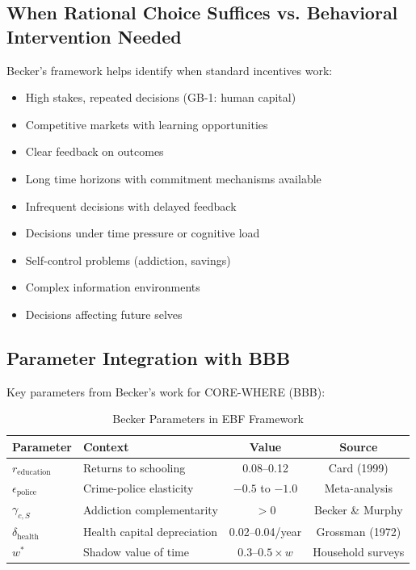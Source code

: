\subsection{When Rational Choice Suffices vs. Behavioral Intervention Needed}

Becker's framework helps identify when standard incentives work:

\begin{tcolorbox}[colback=green!5!white,colframe=green!75!black,title=Rational Choice Sufficient]
\begin{itemize}
    \item High stakes, repeated decisions (GB-1: human capital)
    \item Competitive markets with learning opportunities
    \item Clear feedback on outcomes
    \item Long time horizons with commitment mechanisms available
\end{itemize}
\end{tcolorbox}

\begin{tcolorbox}[colback=red!5!white,colframe=red!75!black,title=Behavioral Intervention Needed]
\begin{itemize}
    \item Infrequent decisions with delayed feedback
    \item Decisions under time pressure or cognitive load
    \item Self-control problems (addiction, savings)
    \item Complex information environments
    \item Decisions affecting future selves
\end{itemize}
\end{tcolorbox}

\subsection{Parameter Integration with BBB}

Key parameters from Becker's work for CORE-WHERE (BBB):

\begin{table}[htbp]
\centering
\caption{Becker Parameters in EBF Framework}
\label{tab:gb-parameters}
\begin{tabular}{llcc}
\toprule
\textbf{Parameter} & \textbf{Context} & \textbf{Value} & \textbf{Source} \\
\midrule
$r_{\text{education}}$ & Returns to schooling & 0.08--0.12 & Card (1999) \\
$\epsilon_{\text{police}}$ & Crime-police elasticity & $-0.5$ to $-1.0$ & Meta-analysis \\
$\gamma_{c,S}$ & Addiction complementarity & $> 0$ & Becker \& Murphy \\
$\delta_{\text{health}}$ & Health capital depreciation & 0.02--0.04/year & Grossman (1972) \\
$w^*$ & Shadow value of time & $0.3$--$0.5 \times w$ & Household surveys \\
\bottomrule
\end{tabular}
\end{table}

